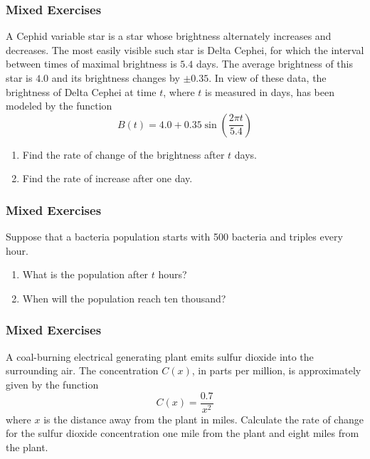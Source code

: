 \documentclass[xcolor=dvipsnames]{beamer}
\begin{document}
\begin{frame}
  \frametitle{Mixed Exercises}
  {\ubung} A Cephid variable star is a star whose brightness alternately
  increases and decreases. The most easily visible such star is Delta
  Cephei, for which the interval between times of maximal brightness
  is $5.4$ days. The average brightness of this star is $4.0$ and its
  brightness changes by $\pm{}0.35$. In view of these data, the
  brightness of Delta Cephei at time $t$, where $t$ is measured in
  days, has been modeled by the function
  \begin{equation}
    \label{eq:duusecho}
    B(t)=4.0+0.35\sin(\frac{2\pi{}t}{5.4})  
  \end{equation}
  \begin{enumerate}
  \item Find the rate of change of the brightness after $t$ days.
  \item Find the rate of increase after one day.
  \end{enumerate}
\end{frame}


\begin{frame}
  \frametitle{Mixed Exercises}
  {\ubung} Suppose that a bacteria population starts with 500 bacteria and
  triples every hour.
  \begin{enumerate}
  \item What is the population after $t$ hours?
  \item When will the population reach ten thousand?
  \end{enumerate}
\end{frame}

\begin{frame}
  \frametitle{Mixed Exercises}
  {\ubung} A coal-burning electrical generating plant emits sulfur dioxide into
  the surrounding air. The concentration $C(x)$, in parts per million,
  is approximately given by the function
  \begin{equation}
    \label{eq:sahtuodo}
    C(x)=\frac{0.7}{x^{2}}
  \end{equation}
  where $x$ is the distance away from the plant in miles. Calculate
  the rate of change for the sulfur dioxide concentration one mile
  from the plant and eight miles from the plant.
\end{frame}
\end{document}
